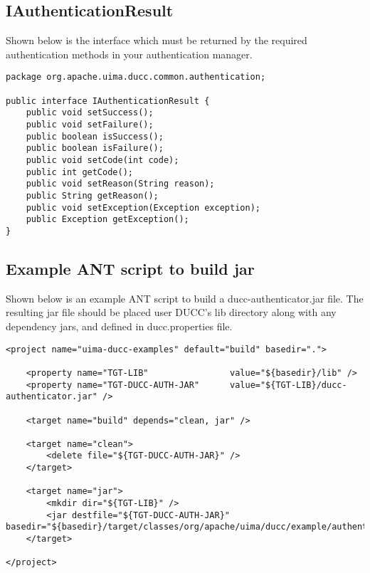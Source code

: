 \subsection{IAuthenticationResult}
    \begin{description}
    
    Shown below is the interface which must be returned by the required
    authentication methods in your authentication manager.
    
    \begin{verbatim}
package org.apache.uima.ducc.common.authentication;
    
public interface IAuthenticationResult {
    public void setSuccess();
    public void setFailure();
    public boolean isSuccess();
    public boolean isFailure();
    public void setCode(int code);
    public int getCode();
    public void setReason(String reason);
    public String getReason();
    public void setException(Exception exception);
    public Exception getException();
}
    \end{verbatim}
    \end{description}
    
\subsection{Example ANT script to build jar}
    \begin{description}
    
    Shown below is an example ANT script to build a ducc-authenticator.jar file.
    The resulting jar file should be placed user DUCC's lib directory along with
    any dependency jars, and defined in ducc.properties file.
    
    \begin{verbatim}
<project name="uima-ducc-examples" default="build" basedir=".">
    
    <property name="TGT-LIB"                value="${basedir}/lib" />
    <property name="TGT-DUCC-AUTH-JAR"      value="${TGT-LIB}/ducc-authenticator.jar" />
    
    <target name="build" depends="clean, jar" />
    
    <target name="clean">
        <delete file="${TGT-DUCC-AUTH-JAR}" />
    </target>
    
    <target name="jar">
        <mkdir dir="${TGT-LIB}" />
        <jar destfile="${TGT-DUCC-AUTH-JAR}" basedir="${basedir}/target/classes/org/apache/uima/ducc/example/authentication/module"/>
    </target>
    
</project>
    \end{verbatim}
    \end{description}
    
